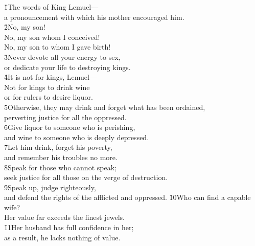 \begin{poetry}
\poeml {}
\v{1}The words of King Lemuel--- \\
\poeml a pronouncement with which his mother encouraged him. \\
\poeml \v{2}No, my son! \\
\poemll    No, my son whom I conceived! \\
\poemlll       No, my son to whom I gave birth! \\
\poeml \v{3}Never devote all your energy to sex, \\
\poemll    or dedicate your life to destroying kings. \\
\poeml \v{4}It is not for kings, Lemuel--- \\
\poemll    Not for kings to drink wine \\
\poemlll       or for rulers to desire liquor. \\
\poeml \v{5}Otherwise, they may drink and forget what has been ordained, \\
\poemll    perverting justice for all the oppressed. \\
\poeml \v{6}Give liquor to someone who is perishing, \\
\poemll    and wine to someone who is deeply depressed. \\
\poeml \v{7}Let him drink, forget his poverty, \\
\poemll    and remember his troubles no more. \\
\poeml \v{8}Speak for those who cannot speak; \\
\poemll    seek justice for all those on the verge of destruction. \\
\poeml \v{9}Speak up, judge righteously, \\
\poemll    and defend the rights of the afflicted and oppressed.
\poeml \v{10}Who can find a capable wife? \\
\poemll    Her value far exceeds the finest jewels. \\
\poeml \v{11}Her husband has full confidence in her; \\
\poemll    as a result, he lacks nothing of value. \\

\end{poetry}
